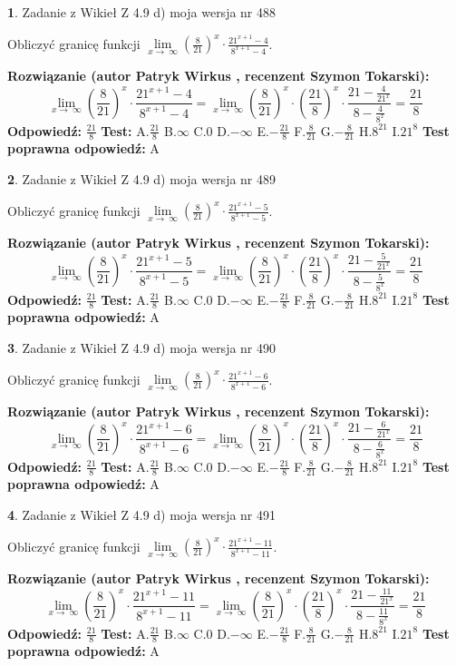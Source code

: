 \documentclass[12pt, a4paper]{article}
\theoremstyle{definition} %
\newtheorem{zad}{}
\newcommand{\zadStart}[1]{\begin{zad}#1\newline}
\newcommand{\zadStop}{\end{zad}}
\newcommand{\rozwStart}[2]{\noindent \textbf{Rozwiązanie (autor #1 , recenzent #2): }\newline}
\newcommand{\rozwStop}{\newline}
\newcommand{\odpStart}{\noindent \textbf{Odpowiedź:}\newline}
\newcommand{\odpStop}{\newline}
\newcommand{\testStart}{\noindent \textbf{Test:}\newline}
\newcommand{\testStop}{\newline}
\newcommand{\kluczStart}{\noindent \textbf{Test poprawna odpowiedź:}\newline}
\newcommand{\kluczStop}{\newline}
\begin{document}
\zadStart{Zadanie z Wikieł Z 4.9 d) moja wersja nr 488}


Obliczyć granicę funkcji  $\lim\limits_{x\to\ \infty}(\frac{8}{21})^{x}\cdot\frac{21^{x+1}-4}{8^{x+1}-4}$.
\zadStop
\rozwStart{Patryk Wirkus}{Szymon Tokarski}
$$\lim\limits_{x\to\ \infty}(\frac{8}{21})^{x}\cdot\frac{21^{x+1}-4}{8^{x+1}-4}=\lim\limits_{x\to\ \infty}(\frac{8}{21})^{x}\cdot(\frac{21}{8})^{x} \cdot \frac{21-\frac{4}{21^{x}}}{8-\frac{4}{8^{x}}} = \frac{21}{8}$$
\rozwStop
\odpStart
$\frac{21}{8}$
\odpStop
\testStart
A.$\frac{21}{8}$ B.$\infty$ C.$0$ D.$-\infty$ E.$-\frac{21}{8}$
F.$\frac{8}{21}$ G.$-\frac{8}{21}$
H.$8^{21}$
I.$21^{8}$
\testStop
\kluczStart
A
\kluczStop



\zadStart{Zadanie z Wikieł Z 4.9 d) moja wersja nr 489}


Obliczyć granicę funkcji  $\lim\limits_{x\to\ \infty}(\frac{8}{21})^{x}\cdot\frac{21^{x+1}-5}{8^{x+1}-5}$.
\zadStop
\rozwStart{Patryk Wirkus}{Szymon Tokarski}
$$\lim\limits_{x\to\ \infty}(\frac{8}{21})^{x}\cdot\frac{21^{x+1}-5}{8^{x+1}-5}=\lim\limits_{x\to\ \infty}(\frac{8}{21})^{x}\cdot(\frac{21}{8})^{x} \cdot \frac{21-\frac{5}{21^{x}}}{8-\frac{5}{8^{x}}} = \frac{21}{8}$$
\rozwStop
\odpStart
$\frac{21}{8}$
\odpStop
\testStart
A.$\frac{21}{8}$ B.$\infty$ C.$0$ D.$-\infty$ E.$-\frac{21}{8}$
F.$\frac{8}{21}$ G.$-\frac{8}{21}$
H.$8^{21}$
I.$21^{8}$
\testStop
\kluczStart
A
\kluczStop



\zadStart{Zadanie z Wikieł Z 4.9 d) moja wersja nr 490}


Obliczyć granicę funkcji  $\lim\limits_{x\to\ \infty}(\frac{8}{21})^{x}\cdot\frac{21^{x+1}-6}{8^{x+1}-6}$.
\zadStop
\rozwStart{Patryk Wirkus}{Szymon Tokarski}
$$\lim\limits_{x\to\ \infty}(\frac{8}{21})^{x}\cdot\frac{21^{x+1}-6}{8^{x+1}-6}=\lim\limits_{x\to\ \infty}(\frac{8}{21})^{x}\cdot(\frac{21}{8})^{x} \cdot \frac{21-\frac{6}{21^{x}}}{8-\frac{6}{8^{x}}} = \frac{21}{8}$$
\rozwStop
\odpStart
$\frac{21}{8}$
\odpStop
\testStart
A.$\frac{21}{8}$ B.$\infty$ C.$0$ D.$-\infty$ E.$-\frac{21}{8}$
F.$\frac{8}{21}$ G.$-\frac{8}{21}$
H.$8^{21}$
I.$21^{8}$
\testStop
\kluczStart
A
\kluczStop



\zadStart{Zadanie z Wikieł Z 4.9 d) moja wersja nr 491}


Obliczyć granicę funkcji  $\lim\limits_{x\to\ \infty}(\frac{8}{21})^{x}\cdot\frac{21^{x+1}-11}{8^{x+1}-11}$.
\zadStop
\rozwStart{Patryk Wirkus}{Szymon Tokarski}
$$\lim\limits_{x\to\ \infty}(\frac{8}{21})^{x}\cdot\frac{21^{x+1}-11}{8^{x+1}-11}=\lim\limits_{x\to\ \infty}(\frac{8}{21})^{x}\cdot(\frac{21}{8})^{x} \cdot \frac{21-\frac{11}{21^{x}}}{8-\frac{11}{8^{x}}} = \frac{21}{8}$$
\rozwStop
\odpStart
$\frac{21}{8}$
\odpStop
\testStart
A.$\frac{21}{8}$ B.$\infty$ C.$0$ D.$-\infty$ E.$-\frac{21}{8}$
F.$\frac{8}{21}$ G.$-\frac{8}{21}$
H.$8^{21}$
I.$21^{8}$
\testStop
\kluczStart
A
\kluczStop
\end{document}
